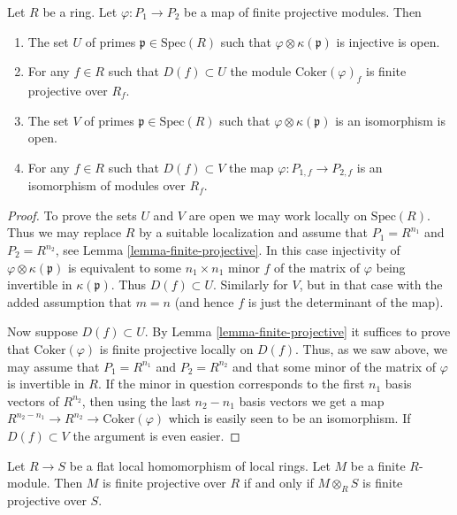 \begin{lemma}
\label{lemma-cokernel-flat}
Let $R$ be a ring. Let $\varphi : P_1 \to P_2$ be a map of
finite projective modules. Then
\begin{enumerate}
\item The set $U$ of primes
$\mathfrak p \in \text{Spec}(R)$ such that
$\varphi \otimes \kappa(\mathfrak p)$ is injective is open.
\item For any $f\in R$ such that
$D(f) \subset U$ the module $\text{Coker}(\varphi)_f$
is finite projective over $R_f$.
\item The set $V$ of primes $\mathfrak p \in \text{Spec}(R)$ such that
$\varphi \otimes \kappa(\mathfrak p)$ is an isomorphism
is open.
\item For any $f\in R$ such that
$D(f) \subset V$ the map $\varphi: P_{1, f} \to P_{2, f}$
is an isomorphism of modules over $R_f$.
\end{enumerate}
\end{lemma}

\begin{proof}
To prove the sets $U$ and $V$ are open we may work locally on
$\text{Spec}(R)$. Thus we may replace $R$ by a suitable localization
and assume that $P_1 = R^{n_1}$ and $P_2 = R^{n_2}$, see Lemma
\ref{lemma-finite-projective}. In this case injectivity of
$\varphi \otimes \kappa(\mathfrak p)$ is equivalent to
some $n_1 \times n_1$ minor $f$ of the matrix of $\varphi$ being
invertible in $\kappa(\mathfrak p)$. Thus $D(f) \subset U$.
Similarly for $V$, but in that case with the added assumption
that $m = n$ (and hence $f$ is just the determinant of the map).

\medskip\noindent
Now suppose $D(f) \subset U$. By Lemma \ref{lemma-finite-projective}
it suffices to prove that $\text{Coker}(\varphi)$ is finite projective
locally on $D(f)$. Thus, as we saw above, we may
assume that $P_1 = R^{n_1}$ and $P_2 = R^{n_2}$
and that some minor of the matrix of $\varphi$ is invertible in $R$.
If the minor in question corresponds to the first $n_1$
basis vectors of $R^{n_2}$, then using the last $n_2-n_1$ basis
vectors we get a map $R^{n_2 - n_1} \to
R^{n_2} \to \text{Coker}(\varphi)$ which is easily seen to be
an isomorphism. If $D(f) \subset V$ the argument is even easier.
\end{proof}

\begin{lemma}
\label{lemma-finite-projective-descends}
Let $R \to S$ be a flat local homomorphism of local rings.
Let $M$ be a finite $R$-module. Then $M$ is finite projective
over $R$ if and only if $M \otimes_R S$ is finite projective
over $S$.
\end{lemma}

